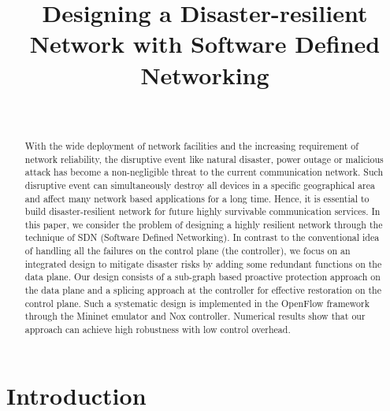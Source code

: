 \documentclass[10pt,journal]{IEEEtran}
\begin{document}
\title{Designing a Disaster-resilient Network with Software Defined Networking}

\author{

\\
}
\maketitle


\begin{abstract}
With the wide deployment of network facilities and the increasing requirement of network reliability, the disruptive event like natural disaster, power outage or malicious attack has become a non-negligible threat to the current communication network. Such disruptive event can simultaneously destroy all devices in a specific geographical area and affect many network based applications for a long time. Hence, it is essential to build disaster-resilient network for future highly survivable communication services. In this paper, we consider the problem of designing a highly resilient network through the technique of SDN (Software Defined Networking). In contrast to the conventional idea of handling all the failures on the control plane (the controller), we focus on an integrated design to mitigate disaster risks by adding some redundant functions on the data plane. Our design consists of a sub-graph based proactive protection approach on the data plane and a splicing approach at the controller for effective restoration on the control plane. Such a systematic design is implemented in the OpenFlow framework through the Mininet emulator and Nox controller. Numerical results show that our approach can achieve high robustness with low control overhead.
\end{abstract}
\IEEEpeerreviewmaketitle

\section{Introduction}
\end{document}
